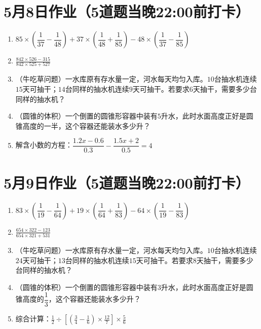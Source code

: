 \documentclass[UTF8,12pt,a4paper]{ctexart}
\newcommand{\BottomWriteSpace}{1.8cm}
\newenvironment{OnePageFiveFill}{
  \small
  \vspace*{0pt}
  \begin{enumerate}[leftmargin=*, itemsep=0pt, topsep=0pt, parsep=0pt, partopsep=0pt]
  \setlength{\parskip}{0pt}
}{
  \end{enumerate}
  \vspace*{\BottomWriteSpace}
  \normalsize
  \newpage
}
\newcommand{\Q}[1]{\item #1\par\vfill}
\newcommand{\Qlast}[1]{\item #1\par}
\begin{document}
\section*{5月8日作业（5道题当晚22:00前打卡）}
\begin{OnePageFiveFill}

\Q{$85 \times \left(\dfrac{1}{37} - \dfrac{1}{48}\right) + 37 \times \left(\dfrac{1}{48} + \dfrac{1}{85}\right) - 48 \times \left(\dfrac{1}{37} - \dfrac{1}{85}\right)$}

\Q{$\displaystyle \frac{842 \times 526 - 315}{842 \times 525 + 527}$}

\Q{（牛吃草问题）一水库原有存水量一定，河水每天均匀入库。$10$台抽水机连续$15$天可抽干；$14$台同样的抽水机连续$9$天可抽干。若要求$6$天抽干，需要多少台同样的抽水机？}

\Q{（圆锥的体积）一个倒置的圆锥形容器中装有$5$升水，此时水面高度正好是圆锥高度的一半，这个容器还能装水多少升？}

\Qlast{解含小数的方程：$\dfrac{1.2x - 0.6}{0.3} - \dfrac{1.5x + 2}{0.5} = 4$}

\end{OnePageFiveFill}

\section*{5月9日作业（5道题当晚22:00前打卡）}
\begin{OnePageFiveFill}

\Q{$83 \times \left(\dfrac{1}{19} - \dfrac{1}{64}\right) + 19 \times \left(\dfrac{1}{64} + \dfrac{1}{83}\right) - 64 \times \left(\dfrac{1}{19} - \dfrac{1}{83}\right)$}

\Q{$\displaystyle \frac{654 \times 322 - 123}{654 \times 321 + 531}$}

\Q{（牛吃草问题）一水库原有存水量一定，河水每天均匀入库。$10$台抽水机连续$24$天可抽干；$13$台同样的抽水机连续$15$天可抽干。若要求$8$天抽干，需要多少台同样的抽水机？}

\Q{（圆锥的体积）一个倒置的圆锥形容器中装有$3$升水，此时水面高度正好是圆锥高度的$\dfrac{1}{3}$，这个容器还能装水多少升？}

\Qlast{综合计算：$\displaystyle \frac{1}{2} \div \left[ \left( \frac{3}{4} - \frac{1}{6} \right) \times \frac{12}{7} \right] \times \frac{5}{6}$}

\end{OnePageFiveFill}
\end{document}
